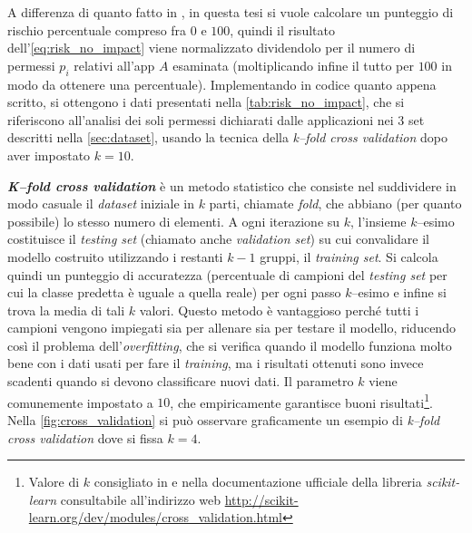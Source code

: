 \documentclass[12pt,a4paper,oneside]{article}
\begin{document}
\noindent A differenza di quanto fatto in \cite{WANG_QUANTITATIVE}, in questa tesi si vuole calcolare un punteggio di rischio percentuale compreso fra $0$ e $100$, quindi il risultato dell'\cref{eq:risk_no_impact} viene normalizzato dividendolo per il numero di permessi $p_i$ relativi all'app $A$ esaminata (moltiplicando infine il tutto per $100$ in modo da ottenere una percentuale). Implementando in codice quanto appena scritto, si ottengono i dati presentati nella \cref{tab:risk_no_impact}, che si riferiscono all'analisi dei soli permessi dichiarati dalle applicazioni nei $3$ set descritti nella \cref{sec:dataset}, usando la tecnica della \textit{k--fold cross validation} dopo aver impostato $k=10$.
\newline

\noindent\textbf{\textit{K--fold cross validation}} \cite{STATISTICAL_INTRO} è un metodo statistico che consiste nel suddividere in modo casuale il \textit{dataset} iniziale in $k$ parti, chiamate \textit{fold}, che abbiano (per quanto possibile) lo stesso numero di elementi. A ogni iterazione su $k$, l'insieme $k$--esimo costituisce il \textit{testing set} (chiamato anche \textit{validation set}) su cui convalidare il modello costruito utilizzando i restanti $k-1$ gruppi, il \textit{training set}. Si calcola quindi un punteggio di accuratezza (percentuale di campioni del \textit{testing set} per cui la classe predetta è uguale a quella reale) per ogni passo $k$--esimo e infine si trova la media di tali $k$ valori. Questo metodo è vantaggioso perché tutti i campioni vengono impiegati sia per allenare sia per testare il modello, riducendo così il problema dell'\textit{overfitting}, che si verifica quando il modello funziona molto bene con i dati usati per fare il \textit{training}, ma i risultati ottenuti sono invece scadenti quando si devono classificare nuovi dati. Il parametro $k$ viene comunemente impostato a $10$, che empiricamente garantisce buoni risultati\footnote{Valore di $k$ consigliato in \cite{CROSS_VALIDATION} e nella documentazione ufficiale della libreria \mbox{\textit{scikit-learn}} consultabile all'indirizzo web \url{http://scikit-learn.org/dev/modules/cross_validation.html}}. Nella \cref{fig:cross_validation} si può osservare graficamente un esempio di \textit{k--fold cross validation} dove si fissa $k=4$.
\end{document}

